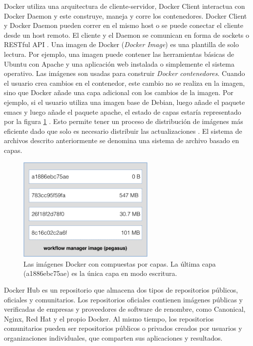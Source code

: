 Docker utiliza una arquitectura de cliente-servidor, Docker Client interactua con Docker Daemon y este construye, maneja y corre los contenedores. Docker Client y Docker Daemon pueden correr en el mismo host o se puede conectar el cliente desde un host remoto. El cliente y el Daemon se comunican en forma de sockets o RESTful API \cite{Docker:2015:understanding}.
Una imagen de Docker (\textit{Docker Image}) es una plantilla de solo lectura. Por ejemplo, una imagen puede contener las herramientas básicas de Ubuntu con Apache y una aplicación web instalada o simplemente el sistema operativo. Las imágenes son usadas para construir \emph{Docker contenedores}. Cuando el usuario crea cambios en el contenedor, este cambio no se realiza en la imagen, sino  que Docker añade una capa adicional con los cambios de la imagen\cite{bui2015analysis}. Por ejemplo, si el usuario utiliza una imagen base de Debian, luego añade el paquete emacs y luego añade el paquete apache, el estado de capas estaría representado por la figura \ref{fig:arquitectura} \cite{Docker:2015:Online}. Esto permite tener un proceso de distribución de imágenes más eficiente dado que solo es necesario distribuir las actualizaciones \cite{bui2015analysis}. El sistema de archivos descrito anteriormente se denomina una sistema de archivo basado en capas.
\begin{figure}[]
  \centering
  \includegraphics[width=0.6\textwidth]{Figures/docker-filesystems-multilayer}
    \caption{Las imágenes Docker con compuestas por capas. La última capa (a1886ebc75ae) es la única capa en modo escritura.}
    \label{fig:arquitectura}
\end{figure}	

Docker Hub es un repositorio que almacena dos tipos de repositorios públicos, oficiales y comunitarios. Los repositorios oficiales contienen imágenes públicas y verificadas de empresas y proveedores de software de renombre, como Canonical, Nginx, Red Hat y el propio Docker. Al mismo tiempo, los repositorios comunitarios pueden ser repositorios públicos o privados creados por usuarios y organizaciones individuales, que comparten sus aplicaciones y resultados. 


